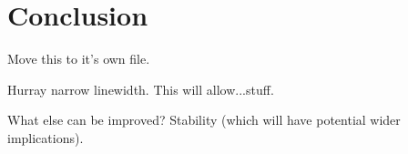 \chapter{Conclusion}

Move this to it's own file.

Hurray narrow linewidth.
This will allow...stuff.

What else can be improved? Stability (which will have potential wider implications).
